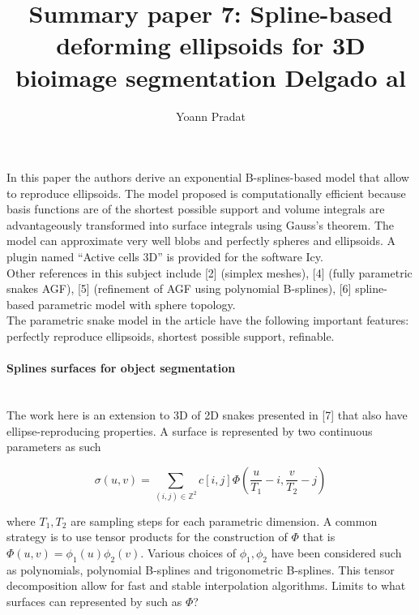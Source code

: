 \documentclass[a4paper, 11pt]{article}
\begin{document}
\title{Summary paper 7: Spline-based deforming ellipsoids for 3D bioimage segmentation Delgado al}
\author{Yoann Pradat}
\maketitle

In this paper the authors derive an exponential B-splines-based model that allow to reproduce ellipsoids. The model 
proposed is computationally efficient because basis functions are of the shortest possible support and volume integrals 
are advantageously transformed into surface integrals using Gauss's theorem. The model can approximate very well blobs 
and perfectly spheres and ellipsoids. A plugin named “Active cells 3D” is provided for the software Icy. \\

Other references in this subject include [2] (simplex meshes), [4] (fully parametric snakes AGF), [5] (refinement of AGF 
using polynomial B-splines), [6] spline-based parametric model with sphere topology. \\

The parametric snake model in the article have the following important features: perfectly reproduce ellipsoids, 
shortest possible support, refinable. 

\paragraph{Splines surfaces for object segmentation} \mbox{} \\

The work here is an extension to 3D of 2D snakes presented in [7] that also have ellipse-reproducing properties. A 
surface is represented by two continuous parameters as such

\begin{equation}
  \sigma(u, v) = \sum_{(i,j) \in \mathbb{Z}^2} c[i,j] \Phi(\frac{u}{T_1}-i, \frac{v}{T_2}-j)
\end{equation}

where $T_1, T_2$ are sampling steps for each parametric dimension. A common strategy is to use tensor products for the 
construction of $\Phi$ that is $\Phi(u, v) = \phi_1(u)\phi_2(v)$. Various choices of $\phi_1, \phi_2$ have been 
considered such as polynomials, polynomial B-splines and trigonometric B-splines. This tensor decomposition allow for 
fast and stable interpolation algorithms. Limits to what surfaces can represented by such as $\Phi$? \\ 
\end{document}
